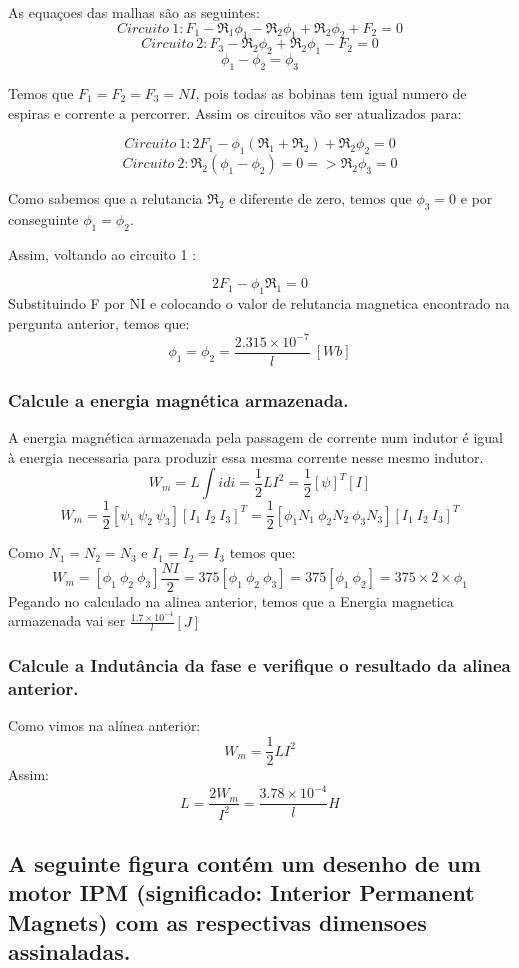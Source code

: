 \documentclass{article}
\begin{document}
As equaçoes das malhas são as seguintes:
$$Circuito \ 1 : F_1 - \Re_1 \phi_1 - \Re_2 \phi_1 + \Re_2 \phi_2 + F_2 = 0$$
$$Circuito \ 2 :F_3 - \Re_2 \phi_2 + \Re_2 \phi_1 - F_2 = 0$$
$$\phi_1 - \phi_2 = \phi_3$$

Temos que $F_1 = F_2 = F_3 = NI$, pois todas as bobinas tem igual numero de espiras e corrente a percorrer. Assim os circuitos vão ser atualizados para:

$$Circuito \ 1 : 2F_1 - \phi_1(\Re_1 +\Re_2) + \Re_2 \phi_2 = 0$$
$$Circuito \ 2 : \Re_2 (\phi_1 - \phi_2) = 0 => \Re_2 \phi_3=0$$

Como sabemos que a relutancia $\Re_2$ e diferente de zero, temos que $\phi_3 = 0$ e por conseguinte $\phi_1 = \phi_2$.

Assim, voltando ao circuito 1 :

$$2F_1 - \phi_1 \Re_1 = 0$$
Substituindo F por NI e colocando o valor de relutancia magnetica encontrado na pergunta anterior, temos que:
$$\phi_1 = \phi_2 = \frac{2.315\times 10^{-7}}{l} \ [Wb]$$

\subsubsection{Calcule a energia magnética armazenada.}
A energia magnética armazenada pela passagem de corrente num indutor é igual à energia necessaria para produzir essa mesma corrente nesse mesmo indutor.
$$W_m = L \int idi = \frac{1}{2} L I^{2} = \frac{1}{2}[\psi]^{T}[I] $$
$$W_m = \frac{1}{2}[\psi_1 \ \psi_2 \ \psi_3][I_1 \ I_2 \ I_3]^{T} = \frac{1}{2}[\phi_1 N_1 \ \phi_2 N_2 \ \phi_3 N_3][I_1 \ I_2 \ I_3]^{T} $$ 

Como $N_1 = N_2 = N_3$ e $I_1 = I_2 = I_3$ temos que:
$$W_m = [\phi_1  \ \phi_2  \ \phi_3 ]\frac{NI}{2} = 375 [\phi_1  \ \phi_2  \ \phi_3 ] = 375 [\phi_1  \ \phi_2] = 375\times 2\times \phi_1 $$
Pegando no calculado na alinea anterior, temos que a Energia magnetica armazenada vai ser $\frac{1.7\times 10^{-4}}{l} [J]$

\subsubsection{Calcule a Indutância da fase e verifique o resultado da alinea anterior.}
Como vimos na alínea anterior: 
$$W_m = \frac{1}{2}LI^{2}$$
Assim:
$$L = \frac{2W_m}{I^{2}} = \frac{3.78 \times 10^{-4}}{l} {H}$$
\subsection{A seguinte figura contém um desenho de um motor IPM (significado: Interior Permanent Magnets) com as respectivas dimensoes assinaladas.}
\end{document}
